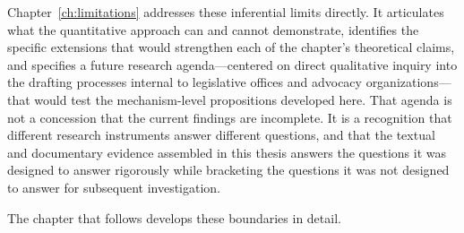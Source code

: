 Chapter~\ref{ch:limitations} addresses these inferential limits directly. It articulates what the quantitative approach can and cannot demonstrate, identifies the specific extensions that would strengthen each of the chapter's theoretical claims, and specifies a future research agenda---centered on direct qualitative inquiry into the drafting processes internal to legislative offices and advocacy organizations---that would test the mechanism-level propositions developed here. That agenda is not a concession that the current findings are incomplete. It is a recognition that different research instruments answer different questions, and that the textual and documentary evidence assembled in this thesis answers the questions it was designed to answer rigorously while bracketing the questions it was not designed to answer for subsequent investigation.
 
The chapter that follows develops these boundaries in detail.
